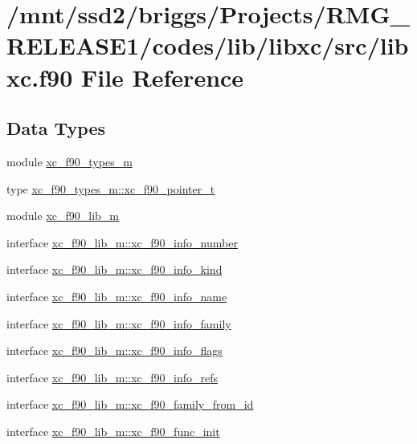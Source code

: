 \hypertarget{libxc_8f90}{\section{/mnt/ssd2/briggs/\-Projects/\-R\-M\-G\-\_\-\-R\-E\-L\-E\-A\-S\-E1/codes/lib/libxc/src/libxc.f90 File Reference}
\label{libxc_8f90}
}
\subsection*{Data Types}
\begin{DoxyCompactItemize}
\item 
module \hyperlink{classxc__f90__types__m}{xc\-\_\-f90\-\_\-types\-\_\-m}
\item 
type \hyperlink{structxc__f90__types__m_1_1xc__f90__pointer__t}{xc\-\_\-f90\-\_\-types\-\_\-m\-::xc\-\_\-f90\-\_\-pointer\-\_\-t}
\item 
module \hyperlink{classxc__f90__lib__m}{xc\-\_\-f90\-\_\-lib\-\_\-m}
\item 
interface \hyperlink{interfacexc__f90__lib__m_1_1xc__f90__info__number}{xc\-\_\-f90\-\_\-lib\-\_\-m\-::xc\-\_\-f90\-\_\-info\-\_\-number}
\item 
interface \hyperlink{interfacexc__f90__lib__m_1_1xc__f90__info__kind}{xc\-\_\-f90\-\_\-lib\-\_\-m\-::xc\-\_\-f90\-\_\-info\-\_\-kind}
\item 
interface \hyperlink{interfacexc__f90__lib__m_1_1xc__f90__info__name}{xc\-\_\-f90\-\_\-lib\-\_\-m\-::xc\-\_\-f90\-\_\-info\-\_\-name}
\item 
interface \hyperlink{interfacexc__f90__lib__m_1_1xc__f90__info__family}{xc\-\_\-f90\-\_\-lib\-\_\-m\-::xc\-\_\-f90\-\_\-info\-\_\-family}
\item 
interface \hyperlink{interfacexc__f90__lib__m_1_1xc__f90__info__flags}{xc\-\_\-f90\-\_\-lib\-\_\-m\-::xc\-\_\-f90\-\_\-info\-\_\-flags}
\item 
interface \hyperlink{interfacexc__f90__lib__m_1_1xc__f90__info__refs}{xc\-\_\-f90\-\_\-lib\-\_\-m\-::xc\-\_\-f90\-\_\-info\-\_\-refs}
\item 
interface \hyperlink{interfacexc__f90__lib__m_1_1xc__f90__family__from__id}{xc\-\_\-f90\-\_\-lib\-\_\-m\-::xc\-\_\-f90\-\_\-family\-\_\-from\-\_\-id}
\item 
interface \hyperlink{interfacexc__f90__lib__m_1_1xc__f90__func__init}{xc\-\_\-f90\-\_\-lib\-\_\-m\-::xc\-\_\-f90\-\_\-func\-\_\-init}

\end{DoxyCompactItemize}
